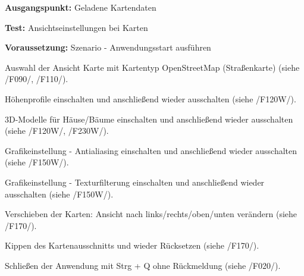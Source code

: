 \documentclass[10pt]{scrreprt}
\newenvironment{details}[1][6pt]{%
  \parskip#1 \parindent6mm \raggedright%
  \def\item{\par\ignorespaces\hangindent=5mm \hangafter1}}{%
  \par\ignorespaces}
\newcommand{\sfbf}[1]{\textbf{\sffamily #1}}
\newcommand{\ziel}[1]{{\fontsize{9.5}{11}\textsf{/#1/}}}
\newcommand{\ziellabel}{Z}
\newcommand{\muss}{\renewcommand{\labelenumi}{\textbf{\ziel{\ziellabel\numprint{\theenumi}0}}}}
\newcommand{\wunsch}{\renewcommand{\labelenumi}{\textbf{\ziel{\ziellabel\numprint{\theenumi}0W}}}}
\begin{document}
\vspace{1.0cm}
\begin{details}[2pt]
\item \sfbf{Ausgangspunkt:} Geladene Kartendaten 
\item \sfbf{Test:} Ansichtseinstellungen bei Karten 
\item \sfbf{Voraussetzung:} Szenario - Anwendungsstart ausführen
\end{details}
\begin{enumerate}[leftmargin = 2.2cm, resume]
\item Auswahl der Ansicht Karte mit Kartentyp OpenStreetMap (Straßenkarte) (siehe \ziel{F090}, \ziel{F110}).
\wunsch
\item Höhenprofile einschalten und anschließend wieder ausschalten (siehe \ziel{F120W}).
\item 3D-Modelle für Häuse/Bäume einschalten und anschließend wieder ausschalten (siehe \ziel{F120W}, \ziel{F230W}).
\item Grafikeinstellung - Antialiasing einschalten und anschließend wieder ausschalten (siehe \ziel{F150W}).
\item Grafikeinstellung - Texturfilterung einschalten und anschließend wieder ausschalten (siehe \ziel{F150W}).
\muss
\item Verschieben der Karten: Ansicht nach links/rechts/oben/unten verändern (siehe \ziel{F170}).
\item Kippen des Kartenausschnitts und wieder Rücksetzen (siehe \ziel{F170}).
\item Schließen der Anwendung mit Strg + Q ohne Rückmeldung (siehe \ziel{F020}).
\end{enumerate}
\end{document}
